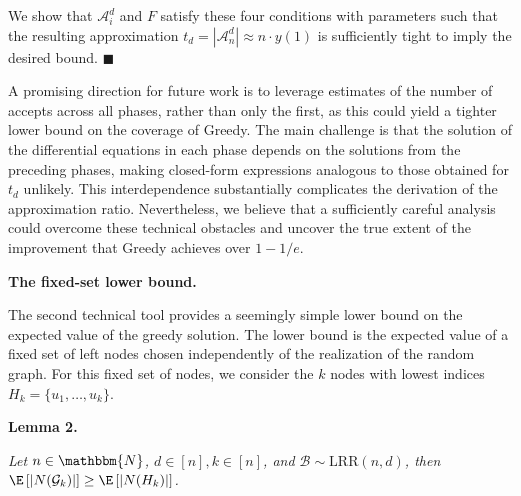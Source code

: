 \documentclass[10pt,a4paper]{article}
\begin{document}
We show that $\mathcal{A}^{d}_{i}$ and $F$ satisfy these four conditions with parameters such that the resulting approximation $t_{d}=|\mathcal{A}^{d}_{n}|\approx n\cdot y(1)$ is sufficiently tight to imply the desired bound.
\ensuremath{\blacksquare}\par





A promising direction for future work is to leverage estimates of the number of accepts across all phases, rather than only the first, as this could yield a tighter lower bound on the coverage of Greedy.
The main challenge is that the solution of the differential equations in each phase depends on the solutions from the preceding phases, making closed-form expressions analogous to those obtained for $t_{d}$ unlikely. This interdependence substantially complicates the derivation of the approximation ratio.
Nevertheless, we believe that a sufficiently careful analysis could overcome these technical obstacles and uncover the true extent of the improvement that Greedy achieves over $1-1/e$.\par





\par\medskip\noindent\textbf{The fixed-set lower bound.}\par




The second technical tool provides a seemingly simple lower bound on the expected value of the greedy solution. The lower bound is the expected value of a fixed set of left nodes chosen independently of the realization of the random graph. For this fixed set of nodes, we consider the $k$ nodes with lowest indices $H_{k}=\{u_{1},\dots,u_{k}\}$.\par





\par\medskip\noindent\textbf{\textbf{Lemma 2}\textbf{.}}\par



\emph{Let $n\in\mathbbm{N}$, $d\in[n],k\in[n]$, and $\mathcal{B}\sim\text{{LRR}}(n,d)$, then $\E\left[|N(\mathcal{G}_{k})|\right]\geq\E\left[|N(H_{k})|\right]$.}\par



\end{document}
